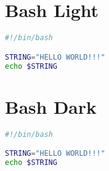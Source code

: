 \section{Bash Light}

\begin{lstlisting}[language=bash, style=customStyleBashLight, caption=Snippet title]
#!/bin/bash

STRING="HELLO WORLD!!!"
echo $STRING 
\end{lstlisting}

\section{Bash Dark}

\begin{lstlisting}[language=bash, style=customStyleBashDark, caption=Snippet title]
#!/bin/bash

STRING="HELLO WORLD!!!"
echo $STRING 
\end{lstlisting}